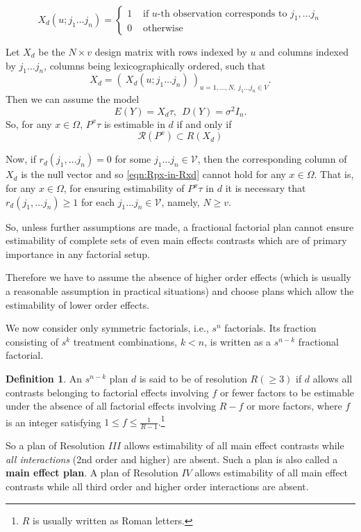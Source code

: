 \documentclass[12pt]{article}
\theoremstyle{definition}
\newtheorem{defn}{Definition}
\newenvironment{definition}{
\begin{tcolorbox}[colback=green!5!white,colframe=green!75!black, parbox = false]\begin{defn} }{\end{defn}\end{tcolorbox} }
\begin{document}
$$X_d(u; j_1 \ldots j_n) = \begin{cases}
	    1 & \text{ if } u\text{-th observation corresponds to } j_1, \dots j_n\\
	    0 & \text{ otherwise}
\end{cases}$$
	
Let $X_d$ be the $N\times v$ design matrix with rows indexed by $u$ and columns indexed by $j_1\ldots j_n$, columns being lexicographically ordered,  such that 
$$X_d = \left( \ X_d(u; j_1\ldots j_n)\  \right)_{u=1, \ldots, N, \ j_1\ldots j_n\in V}. $$ Then we can assume the model
$$E(Y) = X_d\tau, \ \ D(Y) = \sigma^2I_n.$$
So, for any $x\in \Omega$, $P^x\tau$ is estimable in $d$ if and only if
\begin{equation}
    \mathcal{R}(P^x) \subset R(X_d) \label{eqn:Rpx-in-Rxd}
\end{equation}

Now, if $r_d(j_1, \ldots j_n)=0$ for some $j_1\ldots j_n \in \mathcal{V}$, then the corresponding column of $X_d$ is the null vector and so \eqref{eqn:Rpx-in-Rxd} cannot hold for any $x\in \Omega$. That is, for any $x\in \Omega$, for ensuring estimability of $P^x\tau$ in $d$ it is necessary that  $r_d(j_1, \ldots j_n) \geq 1$ for each $j_1\ldots j_n \in \mathcal{V}$,  namely, $N \geq v$. 

So, unless further assumptions are made,  a fractional factorial plan cannot ensure estimability of complete sets of even main effects contrasts which are of primary importance in any factorial setup.

Therefore we have to assume the absence of higher order effects (which is usually a reasonable assumption in practical situations) and choose plans which allow the estimability of lower order effects.

We now consider only symmetric factorials, i.e.,  $s^n$ factorials. Its  fraction  consisting of $s^k$ treatment combinations, $k<n$, is written as a $s^{n-k}$ fractional factorial.

\begin{definition}
    An $s^{n-k}$ plan $d$ is said to be of  resolution $R( \geq 3)$ if $d$ allows all  contrasts belonging to factorial effects involving $f$ or fewer factors to be estimable under the absence of all factorial effects involving $R-f$ or more factors, where $f$ is an integer satisfying $1 \leq f \leq \frac{1}{R-1}.$\footnote{$R$ is usually written as Roman letters.} 
\end{definition}

So a plan of Resolution $III$ allows estimability of all main effect contrasts while \textit{all interactions} (2nd order and higher) are absent. Such a plan is also called a \textbf{main effect plan}. A plan of Resolution $IV$ allows estimability of all main effect contrasts while all third order and higher order interactions are absent. 
	 
\end{document}
